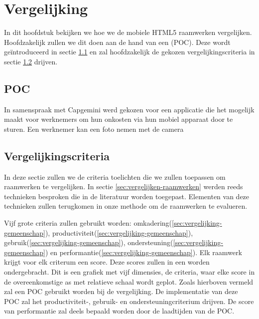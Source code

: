 \chapter{Vergelijking}
\label{chap:vergelijking}

In dit hoofdstuk bekijken we hoe we de mobiele HTML5 raamwerken vergelijken.
Hoofdzakelijk zullen we dit doen aan de hand van een  (POC).
Deze wordt geïntroduceerd in sectie \ref{sec:vergelijking-poc} en zal hoofdzakelijk de gekozen vergelijkingscriteria in sectie \ref{sec:vergelijking-criteria} drijven.


\section{POC} %
\label{sec:vergelijking-poc}
In samenspraak met Capgemini werd gekozen voor een applicatie die het mogelijk maakt voor werknemers om hun onkosten via hun mobiel apparaat door te sturen.
Een werknemer kan een foto nemen met de camera 

\section{Vergelijkingscriteria} %
\label{sec:vergelijking-criteria}

In deze sectie zullen we de criteria toelichten die we zullen toepassen om raamwerken te vergelijken.
In sectie \ref{sec:vergelijken-raamwerken} werden reeds technieken besproken die in de literatuur worden toegepast.
Elementen van deze technieken zullen terugkomen in onze methode om de raamwerken te evalueren.

Vijf grote criteria zullen gebruikt worden:  omkadering(\ref{sec:vergelijking-gemeenschap}), productiviteit(\ref{sec:vergelijking-gemeenschap}), gebruik(\ref{sec:vergelijking-gemeenschap}), ondersteuning(\ref{sec:vergelijking-gemeenschap}) en performantie(\ref{sec:vergelijking-gemeenschap}). Elk raamwerk krijgt voor elk criterum een score. 
Deze scores zullen in een  worden ondergebracht.  
Dit is een grafiek met vijf dimensies,  de criteria,     waar elke score in de overeenkomstige as met relatieve schaal wordt geplot.
Zoals hierboven vermeld zal een POC gebruikt worden bij de vergelijking.
De implementatie van deze POC zal het productiviteit-, gebruik- en ondersteuningcriterium drijven.  
De score van performantie zal deels bepaald worden door de laadtijden van de POC.



